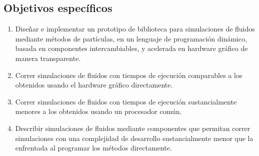 \documentclass[11pt,spanish]{article}
\begin{document}
\subsection{Objetivos específicos}
\begin{enumerate}
   \item Diseñar e implementar un prototipo de biblioteca
       para simulaciones de fluidos mediante métodos de partículas,
       en un lenguaje de programación dinámico,
       basada en componentes intercambiables,
       y acelerada en hardware gráfico de manera transparente.
   \item Correr simulaciones de fluidos con tiempos de ejecución comparables a los
       obtenidos usando el hardware gráfico directamente.
   \item Correr simulaciones de fluidos con tiempos de ejecución sustancialmente menores
       a los obtenidos usando un procesador común.
   \item Describir simulaciones de fluidos mediante componentes que permitan
       correr simulaciones con una complejidad de desarrollo sustancialmente
       menor que la enfrentada al programar los métodos directamente.
\end{enumerate}

\newpage
\end{document}
